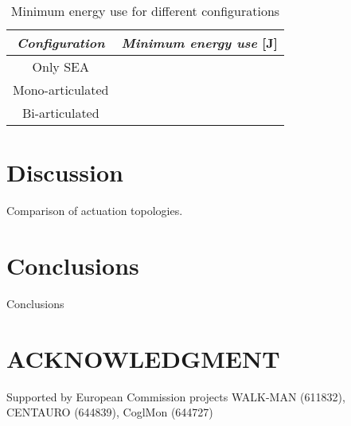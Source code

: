 \documentclass[letterpaper, 10 pt, conference]{ieeeconf}  %
\begin{document}
\begin{table}[h]
	\caption{Minimum energy use for different configurations}
	\label{maxheight}
	\begin{center}
		\begin{tabular}{c||c}
			\textit{Configuration}	& \textit{Minimum energy use} [J] \\
			\hline
			Only SEA &   \\
			\hline
			Mono-articulated &  \\
			\hline
			Bi-articulated & 
		\end{tabular}
	\end{center}
\end{table}

\section{Discussion} \label{sec:discussion}

Comparison of actuation topologies.

\section{Conclusions} \label{sec:conclusions}

Conclusions


\addtolength{\textheight}{-12cm}   %









\section*{ACKNOWLEDGMENT}

Supported by European Commission projects WALK-MAN (611832), CENTAURO (644839), CoglMon (644727)







\end{document}
